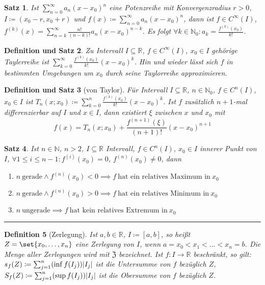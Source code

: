 \documentclass[a4paper]{article}
\newcounter{Sec}
\theoremstyle{marginbreak}
\newtheorem{definition}{Definition}[Sec]
\newtheorem{satz}[definition]{Satz}
\newtheorem{defsatz}[definition]{Definition und Satz}
\newcommand{\sep}{%
	\rule{\textwidth}{0.3pt}%
	\stepcounter{Sec}%
	}
\newcommand{\series}[1][1]{\sum_{n=#1}^\infty}
\newcommand{\ps}[1][a]{\series[0]#1_n(x-x_0)^n}
\begin{document}
	\begin{satz}
		Ist $\ps$ eine Potenzreihe mit Konvergenzradius $r>0$, $I\coloneqq(x_0-r,x_0+r)$ und
		$f(x)\coloneqq\ps$, dann ist $f\in C^\infty(I)$, $f^{(k)}(x)=\sum_{n=k}^{\infty}\frac{n!}{(n-k)!}a_n(x-x_0)^{n-k}$.
		Es folgt $\forall k\in\mathbb{N}_0:a_k=\frac{f^{(k)}(x_0)}{k!}$.
	\end{satz}
	\begin{defsatz}
		Zu Intervall $I\subseteq\mathbb{R}$, $f\in C^\infty(I)$, $x_0\in I$ gehörige
		Taylerreihe ist $\sum_{k=0}^\infty\frac{f^{(k)}(x_0)}{k!}(x - x_0)^k$.
		Hin und wieder lässt sich $f$ in bestimmten Umgebungen um $x_0$ durch seine
		Taylorreihe approximieren.
	\end{defsatz}
	\begin{defsatz}[von Taylor]
		Für Intervall $I\subseteq\mathbb{R}$, $n\in\mathbb{N}_0$, $f\in  C^n(I)$,
		$x_0\in I$ ist $T_n(x;x_0)\coloneqq\sum_{k=0}^n\frac{f^{(k)}(x_0)}{k!}(x-x_0)^k$.
		Ist $f$ zusätzlich $n+1$-mal differenzierbar auf $I$ und $x\in I$, dann existiert
		$\xi$ zwischen $x$ und $x_0$ mit
		\[ f(x) = T_n(x;x_0)+\frac{f^{(n+1)}(\xi)}{(n+1)!}(x-x_0)^{n+1} \]
	\end{defsatz}
	\begin{satz}
		Ist $n\in\mathbb{N}$, $n>2$, $I\subseteq\mathbb{R}$ Intervall,
		$f\in C^n(I)$, $x_0\in I$ innerer Punkt von $I$, $\forall 1\leq i\leq n-1:f^{(i)}(x_0)=0$,
		$f^{(n)}(x_0)\neq0$, dann
		\begin{enumerate}[label=(\alph*)]
			\item $n~\text{gerade}\wedge f^{(n)}(x_0)<0\implies f~\text{hat ein relatives Maximum in}~x_0$
			\item $n~\text{gerade}\wedge f^{(n)}(x_0)>0\implies f~\text{hat ein relatives Minimum in}~x_0$
			\item $n~\text{ungerade}\implies f~\text{hat kein relatives Extremum in}~x_0$
		\end{enumerate}
	\end{satz}
	\sep
	\begin{definition}[Zerlegung]
		Ist $a,b\in\mathbb{R}$, $I\coloneqq[a,b]$, so heißt $Z=\set{x_0,\ldots,x_n}$ eine
		Zerlegung von $I$, wenn $a=x_0<x_1<\ldots<x_n=b$. Die Menge aller Zerlegungen
		wird mit $\mathfrak{Z}$ bezeichnet. Ist $f\colon I\to\mathbb{R}$ beschränkt, so gilt:
		$s_f(Z)\coloneqq\sum_{j=1}^n(\inf f(I_j))\abs{I_j}$ ist die Untersumme
		von $f$ bezüglich $Z$, $S_f(Z)\coloneqq\sum_{j=1}^n(\sup f(I_j))\abs{I_j}$
		ist die Obersumme von $f$ bezüglich $Z$.
	\end{definition}
\end{document}
